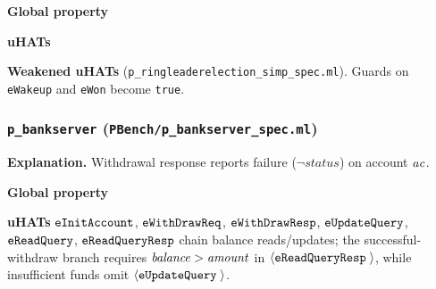 \textbf{Global property}
\vspace{-.35cm}\par{}
\vspace{-.4cm}\par\nobreak\noindent
\textbf{uHATs}
\vspace{-.35cm}\par{}
\vspace{-.4cm}\par\nobreak\noindent
\textbf{Weakened uHATs} (\texttt{p\_ringleaderelection\_simp\_spec.ml}).
Guards on \texttt{eWakeup} and \texttt{eWon} become \texttt{true}.

\subsubsection*{\texttt{p\_bankserver} (\texttt{PBench/p\_bankserver\_spec.ml})}
\textbf{Explanation.}
Withdrawal response reports failure (\(\neg\mathit{status}\)) on account \(\mathit{ac}\).

\textbf{Global property}
\vspace{-.35cm}\par{}
\vspace{-.4cm}\par\nobreak\noindent
\textbf{uHATs}
\(\boldsymbol{{\tt eInitAccount}}\), \(\boldsymbol{{\tt eWithDrawReq}}\), \(\boldsymbol{{\tt eWithDrawResp}}\), \(\boldsymbol{{\tt eUpdateQuery}}\), \(\boldsymbol{{\tt eReadQuery}}\), \(\boldsymbol{{\tt eReadQueryResp}}\) chain balance reads/updates; the successful-withdraw branch requires \(\mathit{balance}>\mathit{amount}\) in \({\langle} {\boldsymbol{{\tt eReadQueryResp}}\;{}} {\rangle}\), while insufficient funds omit \({\langle} {\boldsymbol{{\tt eUpdateQuery}}\;{}} {\rangle}\).

